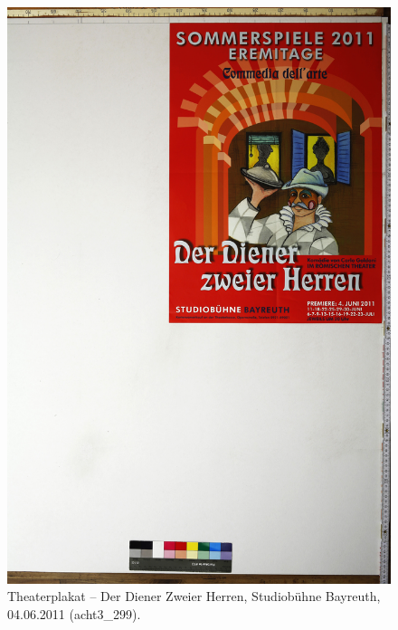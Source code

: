 \documentclass[a4paper,12pt,ngerman]{article}
\begin{document}
\newpage
\begin{figure}[ht]
\includegraphics[width=\linewidth]{Abbildung_10_(acht3_299)}
\centering
\caption{Theaterplakat – Der Diener Zweier Herren, Studiobühne Bayreuth, 04.06.2011 (acht3\_299).}
\end{figure}
\end{document}
